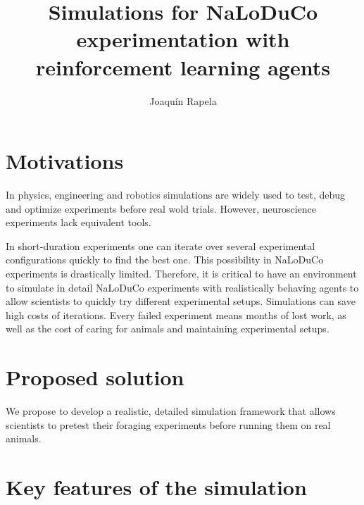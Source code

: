 \documentclass{article}
\title{Simulations for NaLoDuCo experimentation with reinforcement learning
agents}
\author{Joaqu\'{i}n Rapela}
\begin{document}
\maketitle

\section{Motivations}

In physics, engineering and robotics simulations are widely used to test, debug
and optimize experiments before real wold trials. However, neuroscience
experiments lack equivalent tools.

In short-duration experiments one can iterate over several experimental
configurations quickly to find the best one.
%
This possibility in NaLoDuCo experiments is drastically limited.
%
Therefore, it is critical to have an environment to simulate in detail NaLoDuCo
experiments with realistically behaving agents to allow scientists to quickly
try different experimental setups.
%
Simulations can save high costs of iterations. Every failed experiment means
months of lost work, as well as the cost of caring for animals and maintaining
experimental setups.

\section{Proposed solution}

We propose to develop a realistic, detailed simulation framework that allows
scientists to pretest their foraging experiments before running them on real
animals.

\section{Key features of the simulation}
\end{document}
